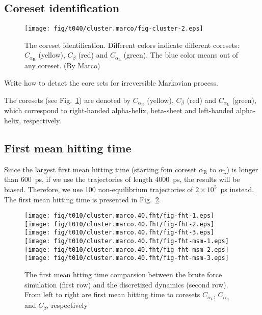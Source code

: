 \documentclass[aps, pre, preprint,unsortedaddress,a4paper,onecolumn]{revtex4}
\newcommand{\redc}[1]{{\color{red} #1}}
\newcommand{\confaa}[0]{{\alpha_{\textrm{R}}}}
\newcommand{\confc}[0]{{\alpha_{\textrm{L}}}}
\begin{document}
\subsection{Coreset identification}

\begin{figure}
  \centering
  \texttt{[image: fig/t040/cluster.marco/fig-cluster-2.eps]}
  \caption{The coreset identification. Different colors indicate different coresets: $C_{\confaa}$ (yellow), $C_\beta$ (red) and $C_{\confc}$ (green).
    The blue color means out of any coreset. (By Marco)}
  \label{fig:cluster}
\end{figure}

\redc{Write how to detact the core sets for irreversible Markovian process}.

The coresets (see Fig.~\ref{fig:cluster}) are denoted by $C_{\confaa}$ (yellow), $C_\beta$ (red) and $C_{\confc}$ (green), which correspond to
right-handed alpha-helix, beta-sheet and left-handed alpha-helix, respectively.

\subsection{First mean hitting time}

Since the largest first mean hitting time (starting fom coreset $\confaa$ to $\confc$) is
longer than 600~ps, if we use the trajectories of length 4000~ps, the
results will be biased. Therefore, we use 100 non-equilibrium trajectories
of $2\times 10^5$~ps instead.
The first mean hitting time is presented in Fig.~\ref{fig:num-6}.

\begin{figure}
  \centering
  \texttt{[image: fig/t010/cluster.marco.40.fht/fig-fht-1.eps]}
  \texttt{[image: fig/t010/cluster.marco.40.fht/fig-fht-2.eps]}
  \texttt{[image: fig/t010/cluster.marco.40.fht/fig-fht-3.eps]}\\
  \texttt{[image: fig/t010/cluster.marco.40.fht/fig-fht-msm-1.eps]}
  \texttt{[image: fig/t010/cluster.marco.40.fht/fig-fht-msm-2.eps]}
  \texttt{[image: fig/t010/cluster.marco.40.fht/fig-fht-msm-3.eps]}
  \caption{The first mean htting time comparsion between the brute
    force simulation (first row) and the discretized dynamics (second row).  From left
    to right are first mean hitting time to coresets $C_{\confc}$,
    $C_{\confaa}$ and $C_{\beta}$, respectively}
  \label{fig:num-6}
\end{figure}
\end{document}
